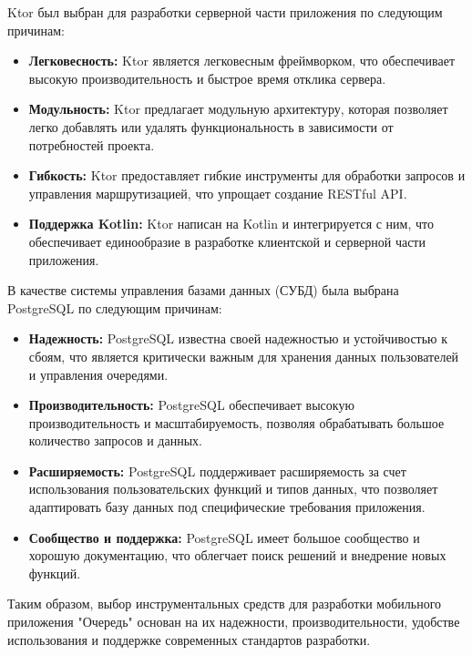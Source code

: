 
Ktor был выбран для разработки серверной части приложения
по следующим причинам:

\begin{itemize}
    \item \textbf{Легковесность:} Ktor является легковесным фреймворком,
		что обеспечивает высокую производительность
		и быстрое время отклика сервера.
    \item \textbf{Модульность:} Ktor предлагает модульную архитектуру,
		которая позволяет легко добавлять или удалять функциональность
		в зависимости от потребностей проекта.
    \item \textbf{Гибкость:} Ktor предоставляет гибкие инструменты
		для обработки запросов и управления маршрутизацией,
		что упрощает создание RESTful API.
    \item \textbf{Поддержка Kotlin:} Ktor написан на Kotlin и интегрируется
		с ним, что обеспечивает единообразие в разработке клиентской
		и серверной части приложения.
\end{itemize}


В качестве системы управления базами данных (СУБД)
была выбрана PostgreSQL по следующим причинам:

\begin{itemize}
    \item \textbf{Надежность:} PostgreSQL известна своей надежностью
		и устойчивостью к сбоям, что является критически важным
		для хранения данных пользователей и управления очередями.
    \item \textbf{Производительность:} PostgreSQL обеспечивает высокую
		производительность и масштабируемость,
		позволяя обрабатывать большое количество запросов и данных.
    \item \textbf{Расширяемость:} PostgreSQL поддерживает расширяемость
		за счет использования пользовательских функций и типов данных,
		что позволяет адаптировать базу данных
		под специфические требования приложения.
    \item \textbf{Сообщество и поддержка:} PostgreSQL имеет большое сообщество
		и хорошую документацию, что облегчает поиск решений
		и внедрение новых функций.
\end{itemize}

Таким образом, выбор инструментальных средств
для разработки мобильного приложения "Очередь" основан на их надежности,
производительности, удобстве использования
и поддержке современных стандартов разработки.

